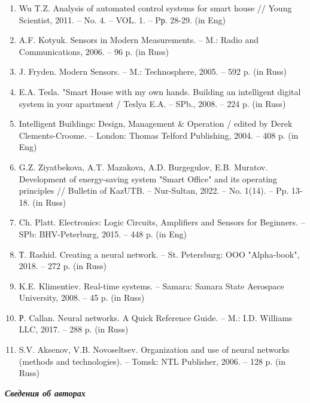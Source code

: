 \begin{enumerate}
\item
Wu T.Z. Analysis of automated control systems for smart house //
Young Scientist, 2011. -- No. 4. -- VOL. 1. -- Pр. 28-29. (in Eng)

\item
A.F. Kotyuk. Sensors in Modern Measurements. -- M.: Radio and
Communications, 2006. -- 96 p. (in Russ)

\item
J. Fryden. Modern Sensors. -- M.: Technosphere, 2005. -- 592 p. (in
Russ)

\item
E.A. Tesla. "Smart House with my own hands. Building an intelligent
digital system in your apartment / Teslya E.A. -- SPb., 2008. -- 224 p.
(in Russ)

\item
Intelligent Buildings: Design, Management \& Operation / edited by
Derek Clements-Croome. -- London: Thomas Telford Publishing, 2004. --
408 p. (in Eng)

\item
G.Z. Ziyatbekova, A.T. Mazakova, A.D. Burgegulov, E.B. Muratov.
Development of energy-saving system "Smart Office" and its operating
principles // Bulletin of KazUTB. -- Nur-Sultan, 2022. -- No. 1(14). --
Pp. 13-18. (in Russ)

\item
Ch. Platt. Electronics: Logic Circuits, Amplifiers and Sensors for
Beginners. -- SPb: BHV-Peterburg, 2015. -- 448 p. (in Eng)

\item
Т. Rashid. Creating a neural network. -- St. Petersburg: OOO
"Alpha-book", 2018. -- 272 p. (in Russ)

\item
K.E. Klimentiev. Real-time systems. -- Samara: Samara State Aerospace
University, 2008. -- 45 p. (in Russ)

\item
Р. Callan. Neural networks. A Quick Reference Guide. -- M.: I.D.
Williams LLC, 2017. -- 288 p. (in Russ)

\item
S.V. Aksenov, V.B. Novoseltsev. Organization and use of neural
networks (methods and technologies). -- Tomsk: NTL Publisher, 2006. --
128 p. (in Russ)
\end{enumerate}

\emph{{\bfseries Сведения об авторах}}


